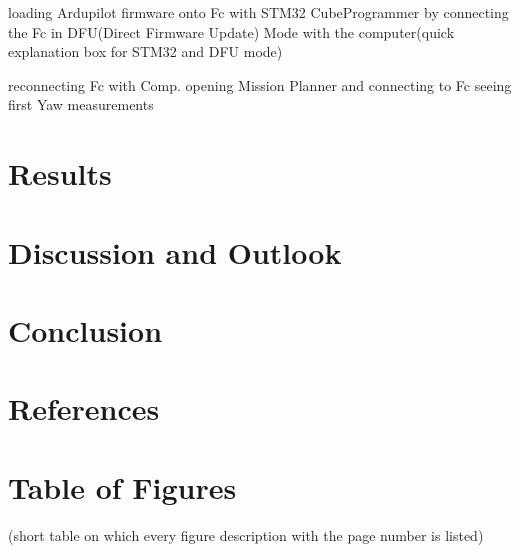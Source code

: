 \documentclass{article}
\begin{document}
	loading Ardupilot firmware onto Fc with STM32 CubeProgrammer by connecting the Fc in DFU(Direct Firmware Update) Mode with the computer(quick explanation box for STM32 and DFU mode)
	
	reconnecting Fc with Comp. 
	opening Mission Planner and connecting to Fc seeing first Yaw measurements 
	\section{Results}
	\section{Discussion and Outlook}
	\section{Conclusion}
	
	\section{References}
	\printbibliography[
	heading=bibintoc,
	title={Bibliography}
	]	
	\section{Table of Figures}
	(short table on which every figure description with the page number is listed)
\end{document}
